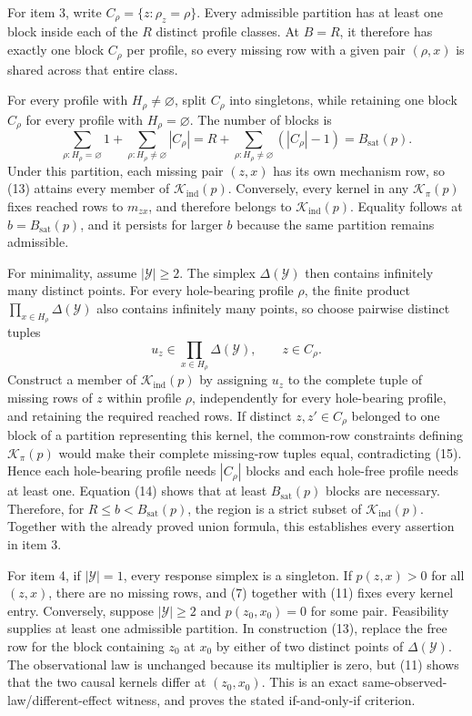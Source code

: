 For item 3, write \(C_\rho=\{z:\rho_z=\rho\}\).  Every admissible
partition has at least one block inside each of the \(R\) distinct
profile classes.  At \(B=R\), it therefore has exactly one block
\(C_\rho\) per profile, so every missing row with a given pair
\((\rho,x)\) is shared across that entire class.

For every profile with \(H_\rho\ne\varnothing\), split \(C_\rho\) into
singletons, while retaining one block \(C_\rho\) for every profile with
\(H_\rho=\varnothing\).  The number of blocks is
\[
 \sum_{\rho:H_\rho=\varnothing}1
 +\sum_{\rho:H_\rho\ne\varnothing}|C_\rho|
 =R+\sum_{\rho:H_\rho\ne\varnothing}(|C_\rho|-1)
 =B_{\mathrm{sat}}(p).
 \tag{14}
\]
Under this partition, each missing pair \((z,x)\) has its own mechanism
row, so (13) attains every member of
\(\mathcal K_{\mathrm{ind}}(p)\).  Conversely, every kernel in any
\(\mathcal K_\pi(p)\) fixes reached rows to \(m_{zx}\), and therefore
belongs to \(\mathcal K_{\mathrm{ind}}(p)\).  Equality follows at
\(b=B_{\mathrm{sat}}(p)\), and it persists for larger \(b\) because
the same partition remains admissible.

For minimality, assume \(|\mathcal Y|\geq2\).  The simplex
\(\Delta(\mathcal Y)\) then contains infinitely many distinct points.
For every hole-bearing profile \(\rho\), the finite product
\(\prod_{x\in H_\rho}\Delta(\mathcal Y)\) also contains infinitely
many points, so choose pairwise distinct tuples
\[
 u_z\in\prod_{x\in H_\rho}\Delta(\mathcal Y),
 \qquad z\in C_\rho.
 \tag{15}
\]
Construct a member of \(\mathcal K_{\mathrm{ind}}(p)\) by assigning
\(u_z\) to the complete tuple of missing rows of \(z\) within profile
\(\rho\), independently for every hole-bearing profile, and retaining
the required reached rows.  If distinct \(z,z'\in C_\rho\) belonged to
one block of a partition representing this kernel, the common-row
constraints defining \(\mathcal K_\pi(p)\) would make their complete
missing-row tuples equal, contradicting (15).  Hence each hole-bearing
profile needs \(|C_\rho|\) blocks and each hole-free profile needs at
least one.  Equation (14) shows that at least
\(B_{\mathrm{sat}}(p)\) blocks are necessary.  Therefore, for
\(R\leq b<B_{\mathrm{sat}}(p)\), the region is a strict subset of
\(\mathcal K_{\mathrm{ind}}(p)\).  Together with the already proved
union formula, this establishes every assertion in item 3.

For item 4, if \(|\mathcal Y|=1\), every response simplex is a singleton.
If \(p(z,x)>0\) for all \((z,x)\), there are no missing rows, and
(7) together with (11) fixes every kernel entry.  Conversely, suppose
\(|\mathcal Y|\geq2\) and \(p(z_0,x_0)=0\) for some pair.  Feasibility
supplies at least one admissible partition.  In construction (13), replace
the free row for the block containing \(z_0\) at \(x_0\) by either of
two distinct points of \(\Delta(\mathcal Y)\).  The observational law is
unchanged because its multiplier is zero, but (11) shows that the two
causal kernels differ at \((z_0,x_0)\).  This is an exact
same-observed-law/different-effect witness, and proves the stated
if-and-only-if criterion.

